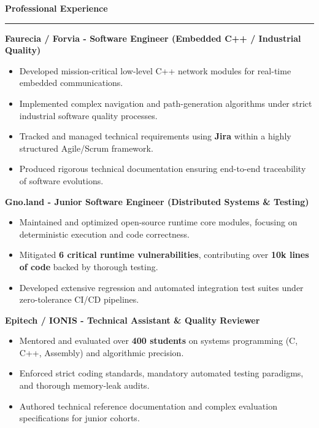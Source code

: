\documentclass[9pt]{extarticle}
\begin{document}
\par\vspace{5pt}

{\large\bfseries Professional Experience}
\par\vspace{-8pt}
\rule{\linewidth}{0.4pt}
\par\vspace{5pt}

{\bfseries Faurecia / Forvia - Software Engineer (Embedded C++ / Industrial Quality)}
\begin{itemize}[noitemsep, topsep=0pt]
    \item Developed mission-critical low-level C++ network modules for real-time embedded communications.
    \item Implemented complex navigation and path-generation algorithms under strict industrial software quality processes.
    \item Tracked and managed technical requirements using {\bfseries Jira} within a highly structured Agile/Scrum framework.
    \item Produced rigorous technical documentation ensuring end-to-end traceability of software evolutions.
\end{itemize}

\par\vspace{5pt}

{\bfseries Gno.land - Junior Software Engineer (Distributed Systems \& Testing)}
\begin{itemize}[noitemsep, topsep=0pt]
    \item Maintained and optimized open-source runtime core modules, focusing on deterministic execution and code correctness.
    \item Mitigated {\bfseries 6 critical runtime vulnerabilities}, contributing over {\bfseries 10k lines of code} backed by thorough testing.
    \item Developed extensive regression and automated integration test suites under zero-tolerance CI/CD pipelines.
\end{itemize}

\par\vspace{5pt}

{\bfseries Epitech / IONIS - Technical Assistant \& Quality Reviewer}
\begin{itemize}[noitemsep, topsep=0pt]
    \item Mentored and evaluated over {\bfseries 400 students} on systems programming (C, C++, Assembly) and algorithmic precision.
    \item Enforced strict coding standards, mandatory automated testing paradigms, and thorough memory-leak audits.
    \item Authored technical reference documentation and complex evaluation specifications for junior cohorts.
\end{itemize}
\end{document}
